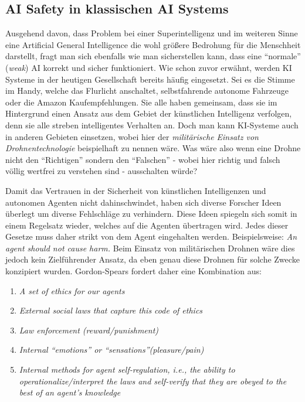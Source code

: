         \subsection{AI Safety in klassischen AI Systems}

        Ausgehend davon, dass Problem bei einer Superintelligenz und im weiteren Sinne eine Artificial General
        Intelligence die wohl größere Bedrohung für die Menschheit darstellt, fragt man sich ebenfalls wie man
        sicherstellen kann, dass eine ``normale'' (\textit{weak}) AI korrekt und sicher funktioniert. Wie schon
        zuvor erwähnt, werden KI Systeme in der heutigen Gesellschaft bereits häufig eingesetzt. Sei es die
        Stimme im Handy, welche das Flurlicht anschaltet, selbstfahrende autonome Fahrzeuge oder die Amazon
        Kaufempfehlungen. Sie alle haben gemeinsam, dass sie im Hintergrund einen Ansatz aus dem Gebiet der künstlichen
        Intelligenz verfolgen, denn sie alle streben intelligentes Verhalten an. Doch man kann KI-Systeme auch in
        anderen Gebieten einsetzen, wobei hier der \textit{militärische Einsatz von Drohnentechnologie} beispielhaft
        zu nennen wäre. \cite[p. 251]{Stulpe2018} Was wäre also wenn eine Drohne nicht den ``Richtigen'' sondern den
        ``Falschen'' - wobei hier richtig und falsch völlig wertfrei zu verstehen sind - ausschalten würde?

        Damit das Vertrauen in der Sicherheit von künstlichen Intelligenzen und autonomen Agenten nicht dahinschwindet,
        haben sich diverse Forscher Ideen überlegt um diverse Fehlschläge zu verhindern.\cite[p. 257]{GordonSpears2003}
        Diese Ideen spiegeln sich somit in einem Regelsatz wieder, welches auf die Agenten übertragen wird. Jedes dieser
        Gesetze muss daher strikt von dem Agent eingehalten werden. Beispielsweise:
        \textit{An agent should not cause harm.} Beim Einsatz von militärischen Drohnen wäre dies jedoch kein
        Zielführender Ansatz, da eben genau diese Drohnen für solche Zwecke konzipiert wurden. Gordon-Spears fordert daher
        eine Kombination aus:

        \begin{enumerate}
            \item \textit{A set of ethics for our agents}
            \item \textit{External social laws that capture this code of ethics}
            \item \textit{Law enforcement (reward/punishment)}
            \item \textit{Internal ``emotions'' or ``sensations''(pleasure/pain)}
            \item \textit{Internal methods for agent self-regulation, i.e., the ability to operationalize/interpret the laws
            and self-verify that they are obeyed to the best of an agent's knowledge}
        \end{enumerate}

